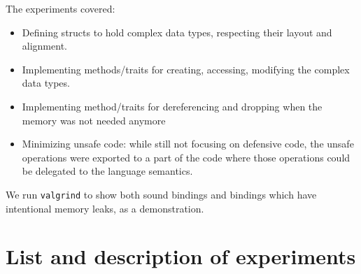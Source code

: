 \documentclass[nomenclature, english, bibtex]{kththesis}
\begin{document}
The experiments covered:

\begin{itemize}
    \item Defining structs to hold complex data types, respecting their layout and alignment.
    \item Implementing methods/traits for creating, accessing, modifying the complex data types.
    \item Implementing method/traits for dereferencing and dropping when the memory was not needed anymore
    \item Minimizing unsafe code: while still not focusing on defensive code, the unsafe operations were exported to a part of the code where those operations could be delegated to the language semantics.   
\end{itemize}


We run \texttt{valgrind} to show both sound bindings and bindings which have intentional memory leaks, as a demonstration.

\section{List and description of experiments}
\end{document}
